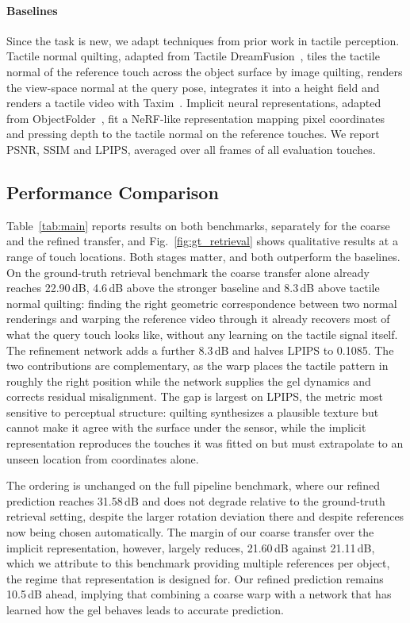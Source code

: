 \paragraph{Baselines}
Since the task is new, we adapt techniques from prior work in tactile perception. Tactile normal
quilting, adapted from Tactile DreamFusion~\cite{tactiledreamfusion}, tiles the tactile normal of
the reference touch across the object surface by image quilting, renders the view-space normal at
the query pose, integrates it into a height field and renders a tactile video with
Taxim~\cite{taxim}. Implicit neural representations, adapted from
ObjectFolder~\cite{objectfolder}, fit a NeRF-like representation mapping pixel coordinates and
pressing depth to the tactile normal on the reference touches. We report PSNR, SSIM and LPIPS,
averaged over all frames of all evaluation touches.

\subsection{Performance Comparison}




Table~\ref{tab:main} reports results on both benchmarks, separately for the coarse and the refined
transfer, and Fig.~\ref{fig:gt_retrieval} shows qualitative results at a range of touch locations.
Both stages matter, and both outperform the baselines. On the ground-truth retrieval benchmark the
coarse transfer alone already reaches 22.90\,dB, 4.6\,dB above the stronger baseline and 8.3\,dB
above tactile normal quilting: finding the right geometric correspondence between two normal
renderings and warping the reference video through it already recovers most of what the query touch
looks like, without any learning on the tactile signal itself. The refinement network adds a further
8.3\,dB and halves LPIPS to 0.1085. The two contributions are complementary, as the warp places the
tactile pattern in roughly the right position while the network supplies the gel dynamics and
corrects residual misalignment. The gap is largest on LPIPS, the metric most sensitive to perceptual structure: quilting
synthesizes a plausible texture but cannot make it agree with the surface under the sensor, while
the implicit representation reproduces the touches it was fitted on but must extrapolate to an
unseen location from coordinates alone.

The ordering is unchanged on the full pipeline benchmark, where our refined prediction reaches
31.58\,dB and does not degrade relative to the ground-truth retrieval setting, despite the larger
rotation deviation there and despite references now being chosen automatically. The margin of our
coarse transfer over the implicit representation, however, largely reduces, 21.60\,dB against
21.11\,dB, which we attribute to this benchmark providing multiple references per object, the
regime that representation is designed for. Our refined prediction remains 10.5\,dB ahead, implying
that combining a coarse warp with a network that has learned how the gel behaves leads to accurate
prediction.

